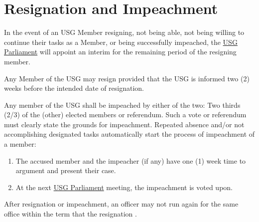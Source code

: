 {\protect\section{Resignation and Impeachment}
In the event of an USG Member resigning, not being able, not being willing to continue their tasks as a Member, or being successfully impeached, the \protect\hyperref[USGParliamentDef]{USG Parliament} will appoint an interim for the remaining period of the resigning member.

\protect\begin{parenum}
\item Any Member of the USG may resign provided that the USG is informed two (2) weeks before the intended date of resignation.

\item Any member of the USG shall be impeached by either of the two: Two thirds (2/3) of the (other) elected members or referendum. Such a vote or referendum must clearly state the grounds for impeachment. Repeated absence  and/or not accomplishing designated tasks automatically start the process of impeachment of a member:
\begin{enumerate}
\item The accused member and the impeacher (if any) have one (1) week time to argument and present their case.
\item At the next \hyperref[USGParliamentDef]{USG Parliament} meeting, the impeachment is voted upon.
\end{enumerate}

\item After resignation or impeachment, an officer may not run again for the same office within the term that the resignation .
\end{parenum}}
